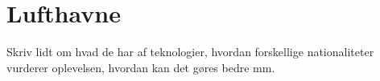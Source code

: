 \section{Lufthavne}
\label{Lufthavne}
%
Skriv lidt om hvad de har af teknologier, hvordan forskellige nationaliteter vurderer oplevelsen, hvordan kan det gøres bedre mm. 